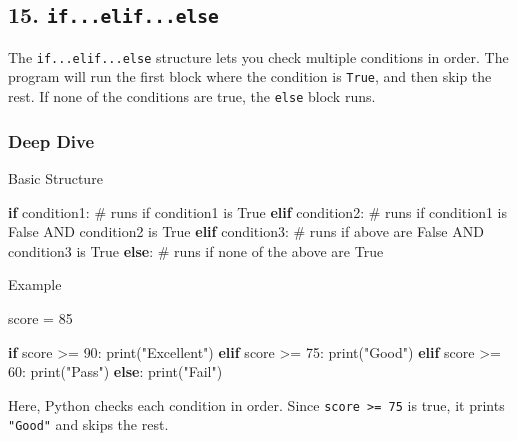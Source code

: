\documentclass[
  letterpaper,
  DIV=11,
  numbers=noendperiod]{scrreprt}
\newenvironment{Shaded}{\begin{snugshade}}{\end{snugshade}}
\newcommand{\BuiltInTok}[1]{\textcolor[rgb]{0.00,0.23,0.31}{#1}}
\newcommand{\CommentTok}[1]{\textcolor[rgb]{0.37,0.37,0.37}{#1}}
\newcommand{\ControlFlowTok}[1]{\textcolor[rgb]{0.00,0.23,0.31}{\textbf{#1}}}
\newcommand{\DecValTok}[1]{\textcolor[rgb]{0.68,0.00,0.00}{#1}}
\newcommand{\NormalTok}[1]{\textcolor[rgb]{0.00,0.23,0.31}{#1}}
\newcommand{\OperatorTok}[1]{\textcolor[rgb]{0.37,0.37,0.37}{#1}}
\newcommand{\StringTok}[1]{\textcolor[rgb]{0.13,0.47,0.30}{#1}}
\begin{document}
\subsection{\texorpdfstring{15.
\texttt{if...elif...else}}{15. if...elif...else}}\label{if...elif...else}

The \texttt{if...elif...else} structure lets you check multiple
conditions in order. The program will run the first block where the
condition is \texttt{True}, and then skip the rest. If none of the
conditions are true, the \texttt{else} block runs.

\subsubsection{Deep Dive}\label{deep-dive-15}

Basic Structure

\begin{Shaded}
\begin{Highlighting}[]
\ControlFlowTok{if}\NormalTok{ condition1:}
    \CommentTok{\# runs if condition1 is True}
\ControlFlowTok{elif}\NormalTok{ condition2:}
    \CommentTok{\# runs if condition1 is False AND condition2 is True}
\ControlFlowTok{elif}\NormalTok{ condition3:}
    \CommentTok{\# runs if above are False AND condition3 is True}
\ControlFlowTok{else}\NormalTok{:}
    \CommentTok{\# runs if none of the above are True}
\end{Highlighting}
\end{Shaded}

Example

\begin{Shaded}
\begin{Highlighting}[]
\NormalTok{score }\OperatorTok{=} \DecValTok{85}

\ControlFlowTok{if}\NormalTok{ score }\OperatorTok{\textgreater{}=} \DecValTok{90}\NormalTok{:}
    \BuiltInTok{print}\NormalTok{(}\StringTok{"Excellent"}\NormalTok{)}
\ControlFlowTok{elif}\NormalTok{ score }\OperatorTok{\textgreater{}=} \DecValTok{75}\NormalTok{:}
    \BuiltInTok{print}\NormalTok{(}\StringTok{"Good"}\NormalTok{)}
\ControlFlowTok{elif}\NormalTok{ score }\OperatorTok{\textgreater{}=} \DecValTok{60}\NormalTok{:}
    \BuiltInTok{print}\NormalTok{(}\StringTok{"Pass"}\NormalTok{)}
\ControlFlowTok{else}\NormalTok{:}
    \BuiltInTok{print}\NormalTok{(}\StringTok{"Fail"}\NormalTok{)}
\end{Highlighting}
\end{Shaded}

Here, Python checks each condition in order. Since
\texttt{score\ \textgreater{}=\ 75} is true, it prints \texttt{"Good"}
and skips the rest.
\end{document}
